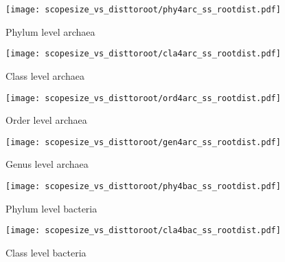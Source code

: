 \begin{figure}[H]
    \centering
    \texttt{[image: scopesize\_vs\_disttoroot/phy4arc\_ss\_rootdist.pdf]}
    \caption{Phylum level archaea}
    \label{phyarc_scopesize}
\end{figure}   

\begin{figure}[H]
    \centering
    \texttt{[image: scopesize\_vs\_disttoroot/cla4arc\_ss\_rootdist.pdf]}
    \caption{Class level archaea}
    \label{claarc_scopesize}
\end{figure}   

\begin{figure}[H]
    \centering
    \texttt{[image: scopesize\_vs\_disttoroot/ord4arc\_ss\_rootdist.pdf]}
    \caption{Order level archaea}
    \label{ordarc_scopesize}
\end{figure}   

\begin{figure}[H]
    \centering
    \texttt{[image: scopesize\_vs\_disttoroot/gen4arc\_ss\_rootdist.pdf]}
    \caption{Genus level archaea}
    \label{genarc_scopesize}
\end{figure}   

\begin{figure}[H]
    \centering
    \texttt{[image: scopesize\_vs\_disttoroot/phy4bac\_ss\_rootdist.pdf]}
    \caption{Phylum level bacteria}
    \label{phybac_scopesize}
\end{figure}   

\begin{figure}[H]
    \centering
    \texttt{[image: scopesize\_vs\_disttoroot/cla4bac\_ss\_rootdist.pdf]}
    \caption{Class level bacteria}
    \label{clabac_scopesize}
\end{figure}   






